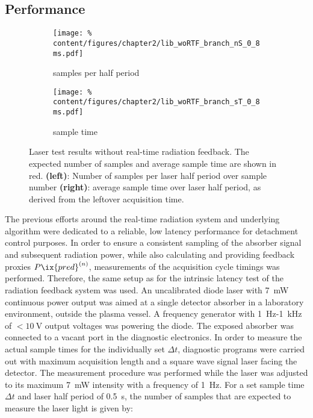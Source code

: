         \subsection{Performance}\label{sec:drawbacks}%
%
            \begin{figure}[t]%
                \centering%
                \begin{subfigure}{0.48\textwidth}%
                    \texttt{[image: \%
                        content/figures/chapter2/lib\_woRTF\_branch\_nS\_0\_8ms.pdf]}%
                    \caption{samples per half period}
                \end{subfigure}%
                \hspace*{0.25cm}%
                \begin{subfigure}{0.48\textwidth}%
                    \texttt{[image: \%
                        content/figures/chapter2/lib\_woRTF\_branch\_sT\_0\_8ms.pdf]}%
                    \caption{sample time}
                \end{subfigure}%
                \caption{Laser test results without real-time radiation feedback. The expected number of samples and average sample time are shown in red. \textbf{(left)}: Number of samples per laser half period over sample number \textbf{(right)}: average sample time over laser half period, as derived from the leftover acquisition time.}\label{fig:woRTF_0.8ms}%
            \end{figure}%
%
            The previous efforts around the real-time radiation system and underlying algorithm were dedicated to a reliable, low latency performance for detachment control purposes. In order to ensure a consistent sampling of the absorber signal and subsequent radiation power, while also calculating and providing feedback proxies $P\ix{pred}^{\left(n\right)}$, measurements of the acquisition cycle timings was performed. Therefore, the same setup as for the intrinsic latency test of the radiation feedback system was used. An uncalibrated diode laser with \SI{7}{\milli\watt} continuous power output was aimed at a single detector absorber in a laboratory environment, outside the plasma vessel. A frequency generator with \SI{1}{\hertz}-\SI{1}{\kilo\hertz} of $<\SI{10}{\volt}$ output voltages was powering the diode. The exposed absorber was connected to a vacant port in the diagnostic electronics. In order to measure the actual sample times for the individually set $\Delta t$, diagnostic programs were carried out with maximum acquisition length and a square wave signal laser facing the detector. The measurement procedure was performed while the laser was adjusted to its maximum \SI{7}{\milli\watt} intensity with a frequency of \SI{1}{\hertz}. For a set sample time $\Delta t$ and laser half period of \SI{0.5}{\second}, the number of samples that are expected to measure the laser light is given by:%
